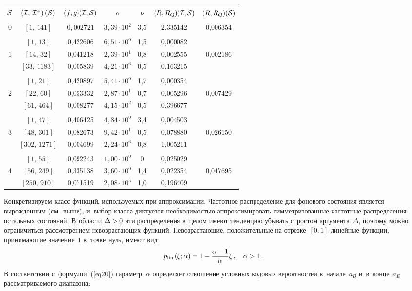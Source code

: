 \begin{multicols}{2}
\begin{table*}
\begin{center}
\begin{tabular}{|c|c|c|c|c|c|c|}
\hline
&&&&&&\\[-11pt]
${\cal S}$ & $({\cal I},\,{\cal I}^+)\,({\cal S})$ & 
$(f,g)({\cal I},{\cal S})$ & $\alpha$ & $\nu$ & $(R,R_Q)({\cal I},{\cal S})$ &
$(R,R_Q)({\cal S})$ \\
\hline
&&&&&&\\[-9pt]
         0 & $[1,~141]$ & $0{,}002721$ & $3,{3}9\cdot10^2$ & 3,5 & 2,335142 & 0,006354 \\
\hline
&&&&&&\\[-9pt]
 & $[1,~13]$ & 0,422606 & $6{,}51\cdot10^0$ & 1,5 & 0,000082 &  \\
1           & $[14,~32]$ & 0,041218 & $2{,}39\cdot10^1$ & 0,8 & 0,002555 &{0,002186}\\
           & $[33,~1183]$ & 0,005839 & $4{,}21\cdot10^6$ & 0,5 & 0,163215 &\\
\hline
&&&&&&\\[-9pt]
 & $[1,~21]$ & 0,420897 & $5{,}41\cdot10^0$ & 1,7 & 0,000354 & \\
2           &$[22,~60]$ & 0,053332 & $2{,}87\cdot10^1$ & 0,7 & 0,005296 &{0,007429}\\
           & $[61,~464]$ & 0,008277 & $4{,}15\cdot10^2$ & 0,5 & 0,396677 &\\
\hline
&&&&&&\\[-9pt]
 & $[1,~47]$ & 0,406425 & $4{,}84\cdot10^0$ & 3,4 & 0,004503 & \\
3           & $[48,~301]$ & 0,082673 & $9{,}42\cdot10^1$ & 0,5 & 0,078880 &{0,026150}\\
           & $[302,~1271]$ & 0,004699 & $2{,}24\cdot10^6$ & 0,8 & 1,005211 &\\
\hline
&&&&&&\\[-9pt]
 & $[1,~55]$ & 0,092243 & $1{,}00\cdot10^0$ & 0\hphantom{,0}   & 0,025029 & \\
4           & $[56,~249]$ & 0,335138 & $3{,}60\cdot10^0$ & 1,4 & 0,022354 & {0,047695}\\
           & $[250,~910]$ & 0,071519 & $2{,}08\cdot10^5$ & 1,0 & 0,196409 &\\
\hline
\end{tabular}
\end{center}
\end{table*}


Конкретизируем класс функций, используемых при аппроксимации. 
Частотное распределение для фонового состояния является вырожденным (см.~выше), 
и~выбор класса диктуется не\-об\-хо\-ди\-мостью аппроксимировать симметризованные час\-тот\-ные 
распределения остальных состояний. В~об\-ласти $\Delta\hm> 0$ эти распределения 
в~целом имеют тенденцию убывать с~ростом аргумента~$\Delta$, поэтому можно 
ограничиться рассмотрением не\-воз\-рас\-та\-ющих функций. Невозрастающие, 
положительные на отрезке~$[0,1]$ линейные функции, принимающие значение~$1$ 
в~точке нуль, имеют вид:
$$
p_{\mathrm{lin}}\left(\xi;\alpha\right) = 1 - 
\displaystyle\frac{\displaystyle \alpha-1\mathstrut}{\displaystyle \alpha\mathstrut}\xi\,, \quad \alpha>1\,.
$$
В соответствии с~формулой~(\ref{eq20}) параметр~$\alpha$ определяет отношение 
условных кодовых вероятностей в~начале~$a_B$  и~в~кон\-це~$a_E$ рассматриваемого 
диапазона:


\end{multicols}
